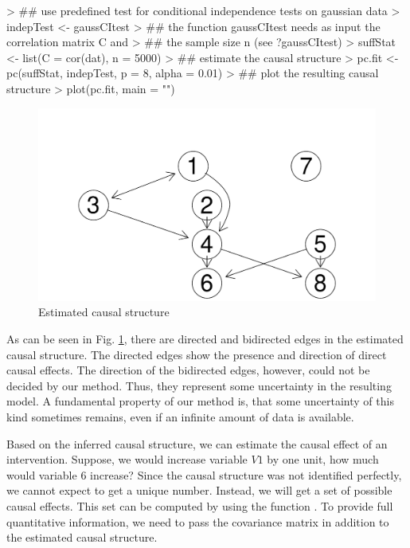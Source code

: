 \documentclass[article]{jss}
\begin{document}
\begin{Schunk}
\begin{Sinput}
> ## use predefined test for conditional independence tests on gaussian data
> indepTest <- gaussCItest 
> ## the function gaussCItest needs as input the correlation matrix C and 
> ## the sample size n (see ?gaussCItest)
> suffStat <- list(C = cor(dat), n = 5000)
> ## estimate the causal structure
> pc.fit <- pc(suffStat, indepTest, p = 8, alpha = 0.01)
> ## plot the resulting causal structure
> plot(pc.fit, main = "")
\end{Sinput}
\end{Schunk}

\begin{figure}
  \begin{center}
\includegraphics{pcalgDoc-exIntroPlot}
\caption{Estimated causal structure}
\label{fig:intro1}
\end{center}
\end{figure}

As can be seen in Fig. \ref{fig:intro1}, there are directed and bidirected
edges in the estimated causal structure. The directed edges show the
presence and direction of direct causal effects. The direction of the
bidirected edges, however, could not be decided by our method. Thus, they
represent some uncertainty in the resulting model. A fundamental property
of our method is, that some uncertainty of this kind sometimes remains,
even if an infinite amount of data is available.

Based on the inferred causal structure, we can estimate the causal
effect of an intervention. Suppose, we would increase variable $V1$ by
one unit, how much would variable 6 increase? Since the causal structure
was not identified perfectly, we cannot expect to get a unique
number. Instead, we will get a set of possible causal effects. This set can
be computed by using the function . To provide full quantitative
information, we need to pass the covariance matrix in addition to the
estimated causal structure.
\end{document}

